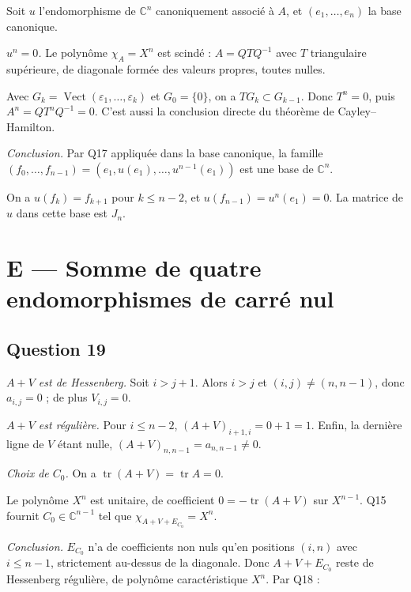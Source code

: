 \documentclass[11pt,a4paper]{article}
\newcommand{\equationajustee}[1]{%
  \sbox{\boiteequation}{$\displaystyle #1$}%
  \ifdim\wd\boiteequation>\linewidth
    \[\resizebox{\linewidth}{!}{\usebox{\boiteequation}}\]%
  \else
    \[#1\]%
  \fi}
\begin{document}
Soit \(u\) l'endomorphisme de \(\mathbb C^n\) canoniquement associé à \(A\), et \((e_1,\dots,e_n)\) la base canonique.

\emph{\(u^n=0\).} Le polynôme \(\chi_A=X^n\) est scindé : \(A=QTQ^{-1}\) avec \(T\) triangulaire supérieure, de diagonale formée des valeurs propres, toutes nulles.

Avec \(G_k=\operatorname{Vect}(\varepsilon_1,\dots,\varepsilon_k)\) et \(G_0=\{0\}\), on a \(TG_k\subset G_{k-1}\). Donc \(T^n=0\), puis \(A^n=QT^nQ^{-1}=0\). C'est aussi la conclusion directe du théorème de Cayley--Hamilton.

\emph{Conclusion.} Par Q17 appliquée dans la base canonique, la famille \((f_0,\dots,f_{n-1})=(e_1,u(e_1),\dots,u^{n-1}(e_1))\) est une base de \(\mathbb C^n\).

On a \(u(f_k)=f_{k+1}\) pour \(k\leqslant n-2\), et \(u(f_{n-1})=u^n(e_1)=0\). La matrice de \(u\) dans cette base est \(J_n\).

\equationajustee{\boxed{A\ \text{est semblable \text{à}}\ J_n.}}

\hypertarget{e-somme-de-quatre-endomorphismes-de-carruxe9-nul}{%
\section{E --- Somme de quatre endomorphismes de carré nul}\label{e-somme-de-quatre-endomorphismes-de-carruxe9-nul}}

\hypertarget{question-19}{%
\subsection{Question 19}\label{question-19}}

\emph{\(A+V\) est de Hessenberg.} Soit \(i>j+1\). Alors \(i>j\) et \((i,j)\neq(n,n-1)\), donc \(a_{i,j}=0\) ; de plus \(V_{i,j}=0\).

\emph{\(A+V\) est régulière.} Pour \(i\leqslant n-2\), \((A+V)_{i+1,i}=0+1=1\). Enfin, la dernière ligne de \(V\) étant nulle, \((A+V)_{n,n-1}=a_{n,n-1}\neq0\).

\emph{Choix de \(C_0\).} On a \(\operatorname{tr}(A+V)=\operatorname{tr}A=0\).

Le polynôme \(X^n\) est unitaire, de coefficient \(0=-\operatorname{tr}(A+V)\) sur \(X^{n-1}\). Q15 fournit \(C_0\in\mathbb C^{n-1}\) tel que \(\chi_{A+V+E_{C_0}}=X^n\).

\emph{Conclusion.} \(E_{C_0}\) n'a de coefficients non nuls qu'en positions \((i,n)\) avec \(i\leqslant n-1\), strictement au-dessus de la diagonale. Donc \(A+V+E_{C_0}\) reste de Hessenberg régulière, de polynôme caractéristique \(X^n\). Par Q18 :
\end{document}
